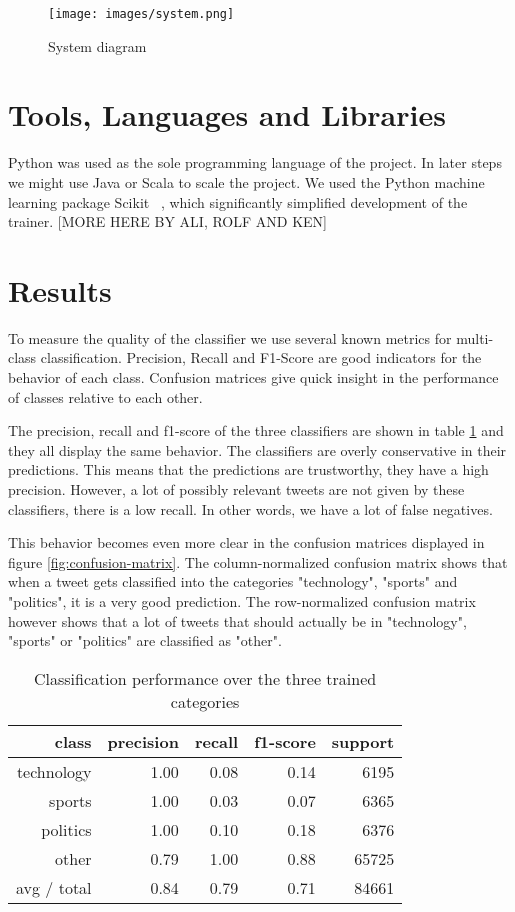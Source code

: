 \documentclass{llncs}
\begin{document}
\begin{figure}[H]
  \centering
  \texttt{[image: images/system.png]}
  \caption{System diagram}
  \label{fig:System diagram}
\end{figure}

\section{Tools, Languages and Libraries}
Python was used as the sole programming language of the project.
In later steps we might use Java or Scala to scale the project.
We used the Python machine learning package Scikit ~\cite{scikit-learn}, which significantly simplified development of the trainer. 
[MORE HERE BY ALI, ROLF AND KEN]

\section{Results}
To measure the quality of the classifier we use several known metrics for multi-class classification. Precision, Recall and F1-Score are good indicators for the behavior of each class. Confusion matrices give quick insight in the performance of classes relative to each other.

The precision, recall and f1-score of the three classifiers are shown in table \ref{tbl:classification-report} and they all display the same behavior. The classifiers are overly conservative in their predictions. This means that the predictions are trustworthy, they have a high precision. However, a lot of possibly relevant tweets are not given by these classifiers, there is a low recall. In other words, we have a lot of false negatives. 

This behavior becomes even more clear in the confusion matrices displayed in figure \ref{fig:confusion-matrix}. The column-normalized confusion matrix shows that when a tweet gets classified into the categories "technology", "sports" and "politics", it is a very good prediction. The row-normalized confusion matrix however shows that a lot of tweets that should actually be in "technology", "sports" or "politics" are classified as "other".

\begin{table}
\begin{center}
\begin{tabular}{|r|r|r|r|r|} \hline
class  & precision   & recall & f1-score  & support \\ \hline
 technology    &   1.00 &     0.08  &    0.14   &   6195 \\
     sports   &    1.00   &   0.03   &   0.07   &   6365 \\
   politics   &    1.00  &    0.10   &   0.18   &   6376 \\
      other   &    0.79 &     1.00  &    0.88   &  65725 \\ \hline
avg / total  &     0.84   &   0.79  &    0.71   &  84661 \\ \hline
\end{tabular}
\end{center}
\caption{Classification performance over the three trained categories}
\label{tbl:classification-report}
\end{table}
 
\end{document}
